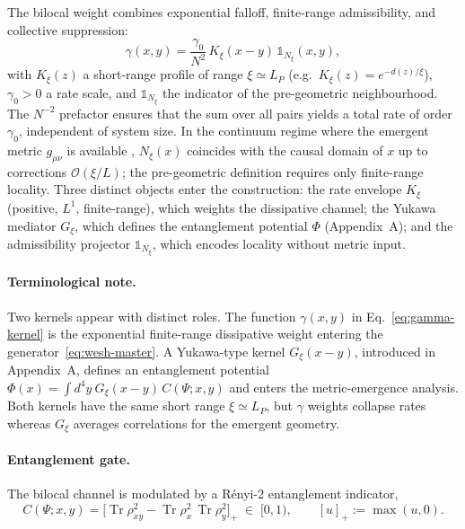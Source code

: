\documentclass[12pt,a4paper]{article}
\renewcommand{\Tr}{\operatorname{Tr}}
\numberwithin{equation}{section}
\begin{document}
\noindent The bilocal weight combines exponential falloff, finite-range
admissibility, and collective suppression:
\begin{equation}
\gamma(x,y) = \frac{\gamma_0}{N^2}\, K_\xi(x-y)\, \mathbb{1}_{N_\xi}(x,y),
\label{eq:gamma-kernel}
\end{equation}
with $K_\xi(z)$ a short-range profile of range $\xi \simeq L_P$
(e.g.\ $K_\xi(z) = e^{-d(z)/\xi}$), $\gamma_0 > 0$ a rate scale, and
$\mathbb{1}_{N_\xi}$ the indicator of the pre-geometric neighbourhood.
The $N^{-2}$ prefactor ensures that the sum over all pairs yields a total rate
of order $\gamma_0$, independent of system size. In the continuum regime
where the emergent metric $g_{\mu\nu}$ is available ,
$N_\xi(x)$ coincides with the causal domain of $x$ up to corrections
$\mathcal{O}(\xi/L)$; the pre-geometric definition requires only
finite-range locality. Three distinct objects enter the construction:
the rate envelope $K_\xi$ (positive, $L^1$, finite-range), which weights
the dissipative channel; the Yukawa mediator $G_\xi$, which defines
the entanglement potential $\Phi$ (Appendix~A); and the admissibility
projector $\mathbb{1}_{N_\xi}$, which encodes locality without metric input.

\paragraph{Terminological note.}
Two kernels appear with distinct roles. The function $\gamma(x,y)$ in
Eq.~\eqref{eq:gamma-kernel} is the exponential finite-range dissipative weight
entering the generator~\eqref{eq:wesh-master}. A Yukawa-type kernel
$G_\xi(x-y)$, introduced in Appendix~A, defines an entanglement potential
$\Phi(x)=\int d^4y\ G_\xi(x-y)\,C(\Psi;x,y)$ and enters the metric-emergence
analysis. Both kernels have the same short range
$\xi\simeq L_P$, but $\gamma$ weights collapse rates whereas $G_\xi$ averages
correlations for the emergent geometry.

\paragraph{Entanglement gate.}
The bilocal channel is modulated by a R\'{e}nyi-2 entanglement indicator,
\begin{equation}
C(\Psi;x,y) = \big[\Tr\rho_{xy}^{2} - \Tr\rho_{x}^{2}\,\Tr\rho_{y}^{2}\big]_+
\;\in\; [0,1),
\qquad [u]_+:=\max(u,0).
\label{eq:renyi-gate}
\end{equation}
\end{document}
